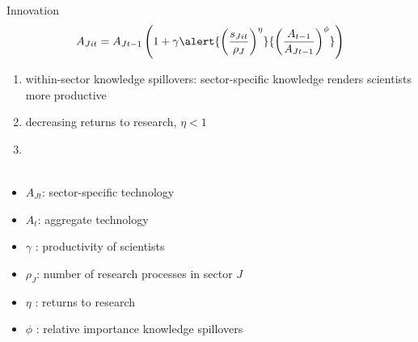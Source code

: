 \documentclass[11pt,aspectratio=169]{beamer}
\begin{document}
\addtocounter{framenumber}{-1}
\begin{frame}{Innovation}
		\vspace{-5mm}
	\large
	\begin{align*}
		A_{Jit}={A_{Jt-1}}\left(1+\gamma\alert{\left(\frac{s_{Jit}}{\rho_J}\right)^{\eta}}{\left(\frac{A_{t-1}}{A_{Jt-1}}\right)^\phi}\right)
	\end{align*}
	\normalsize
	\begin{enumerate}
		\item within-sector knowledge spillovers: sector-specific knowledge renders scientists more productive
		\item \alert{decreasing returns to research, $\eta<1$}
		\item[] \ \\ \  %
	\end{enumerate}
	\small
	\vspace{4mm}
	\hspace{-2mm}
	\begin{minipage}[t!]{0.43\textwidth}
		\vspace{0mm}
		\begin{itemize}
			\item[] $A_{Jt}$: sector-specific technology
			\vspace{-2mm}		
			\item[] $A_t$: aggregate technology
			\vspace{-2mm}
			\item[] $\gamma$ : productivity of scientists
		\end{itemize}
	\end{minipage}
	\vspace{-5mm}
	\begin{minipage}[t!]{0.55\textwidth}
		\vspace{0mm}
		\begin{itemize}	
			\item[] \alert{$\rho_J$: number of research processes in sector $J$}
			\vspace{-2mm}			
			\item[] $\eta$ : returns to research
			\vspace{-2mm}			
			\item[] $\phi$ : relative importance knowledge spillovers
		\end{itemize}
	\end{minipage}
\end{frame}
\end{document}
